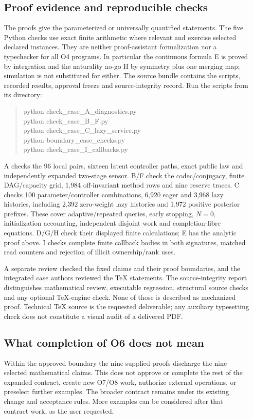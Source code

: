 \documentclass[11pt,a4paper]{article}
\theoremstyle{definition}
\begin{document}
\subsection{Proof evidence and reproducible checks}
The proofs give the parameterized or universally quantified statements.
The five Python checks use exact finite arithmetic where relevant and
exercise selected declared instances. They are neither proof-assistant
formalization nor a typechecker for all O4 programs. In particular the
continuous formula E is proved by integration and the naturality no-go H
by symmetry plus one merging map; simulation is not substituted for either.
The source bundle contains the scripts, recorded results, approval freeze
and source-integrity record. Run the scripts from its directory:
\begin{quote}\ttfamily\small
python check\_case\_A\_diagnostics.py\\
python check\_case\_B\_F.py\\
python check\_case\_C\_lazy\_service.py\\
python boundary\_case\_checks.py\\
python check\_case\_I\_callbacks.py
\end{quote}
A checks the 96 local pairs, sixteen latent controller paths, exact
public law and independently expanded two-stage sensor. B/F check the
codec/conjugacy, finite DAG/capacity grid, 1,984 off-invariant method
rows and nine reserve traces.
C checks 100 parameter/controller combinations, 6,920 eager and 3,968
lazy histories, including 2,392 zero-weight lazy histories and 1,972
positive posterior prefixes. These cover adaptive/repeated queries,
early stopping, $N=0$, initialization accounting, independent disjoint
work and completion-fibre equations. D/G/H check their displayed finite
calculations; E has the analytic proof above. I checks complete finite
callback bodies in both signatures, matched read counters and rejection
of illicit ownership/rank uses.

A separate review checked the fixed claims and their proof boundaries,
and the integrated case authors reviewed the TeX statements. The
source-integrity report distinguishes mathematical review, executable
regression, structural source checks and any optional TeX-engine check.
None of those is described as mechanized proof. Technical TeX source is
the requested deliverable; any auxiliary typesetting check does not
constitute a visual audit of a delivered PDF.

\subsection{What completion of O6 does not mean}
Within the approved boundary the nine supplied proofs discharge the nine
selected mathematical claims. This does not approve or complete the rest
of the expanded contract, create new O7/O8 work, authorize external
operations, or preselect further examples. The broader contract remains
under its existing change and acceptance rules. More examples can be
considered after that contract work, as the user requested.
\end{document}
